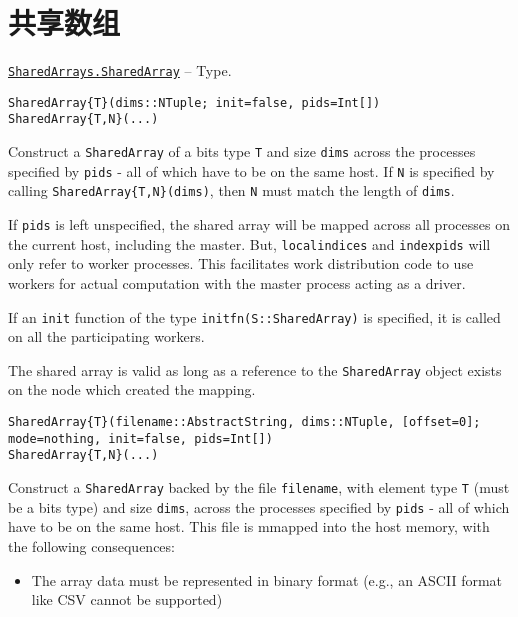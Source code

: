 \hypertarget{3058127117657456394}{}


\chapter{共享数组}


\hypertarget{15069300442338861576}{}
\hyperlink{15069300442338861576}{\texttt{SharedArrays.SharedArray}}  -- {Type.}

\begin{adjustwidth}{2em}{0pt}


\begin{verbatim}
SharedArray{T}(dims::NTuple; init=false, pids=Int[])
SharedArray{T,N}(...)
\end{verbatim}

Construct a \texttt{SharedArray} of a bits type \texttt{T} and size \texttt{dims} across the processes specified by \texttt{pids} - all of which have to be on the same host.  If \texttt{N} is specified by calling \texttt{SharedArray\{T,N\}(dims)}, then \texttt{N} must match the length of \texttt{dims}.

If \texttt{pids} is left unspecified, the shared array will be mapped across all processes on the current host, including the master. But, \texttt{localindices} and \texttt{indexpids} will only refer to worker processes. This facilitates work distribution code to use workers for actual computation with the master process acting as a driver.

If an \texttt{init} function of the type \texttt{initfn(S::SharedArray)} is specified, it is called on all the participating workers.

The shared array is valid as long as a reference to the \texttt{SharedArray} object exists on the node which created the mapping.


\begin{lstlisting}
SharedArray{T}(filename::AbstractString, dims::NTuple, [offset=0]; mode=nothing, init=false, pids=Int[])
SharedArray{T,N}(...)
\end{lstlisting}

Construct a \texttt{SharedArray} backed by the file \texttt{filename}, with element type \texttt{T} (must be a bits type) and size \texttt{dims}, across the processes specified by \texttt{pids} - all of which have to be on the same host. This file is mmapped into the host memory, with the following consequences:

\begin{itemize}
\item The array data must be represented in binary format (e.g., an ASCII format like CSV cannot be supported)



\end{itemize}
\end{adjustwidth}
